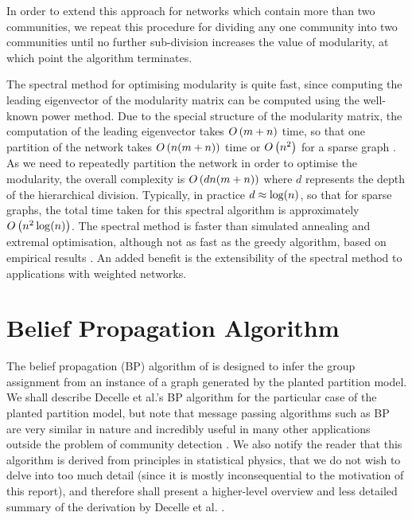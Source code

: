 In order to extend this approach for networks which contain more than two communities, we repeat this procedure for dividing any one community into two communities until no further sub-division increases the value of modularity, at which point the algorithm terminates.

The spectral method for optimising modularity is quite fast, since computing the leading eigenvector of the modularity matrix can be computed using the well-known power method.
Due to the special structure of the modularity matrix, the computation of the leading eigenvector takes $O\left(m+n\right)$ time, so that one partition of the network takes $O\left(n(m+n)\right)$ time or $O\left(n^{2}\right)$ for a sparse graph \cite{For10}.
As we need to repeatedly partition the network in order to optimise the modularity, the overall complexity is $O\left(dn(m+n)\right)$ where $d$ represents the depth of the hierarchical division.
Typically, in practice $d \approx \log(n)$, so that for sparse graphs, the total time taken for this spectral algorithm is approximately $O\left(n^{2}\log(n)\right)$.
The spectral method is faster than simulated annealing and extremal optimisation, although not as fast as the greedy algorithm, based on empirical results \cite{For10}.
An added benefit is the extensibility of the spectral method to applications with weighted networks.


\section{Belief Propagation Algorithm}
\label{sec:beliefPropagationAlgorithm}

The belief propagation (BP) algorithm of \cite{Has06,DKM+13} is designed to infer the group assignment from an instance of a graph generated by the planted partition model.
We shall describe Decelle et al.'s BP algorithm \cite{DKM+13} for the particular case of the planted partition model, but note that message passing algorithms such as BP are very similar in nature and incredibly useful in many other applications outside the problem of community detection \cite{For10}.
We also notify the reader that this algorithm is derived from principles in statistical physics, that we do not wish to delve into too much detail (since it is mostly inconsequential to the motivation of this report), and therefore shall present a higher-level overview and less detailed summary of the derivation by Decelle et al. \cite{DKM+13}. 

